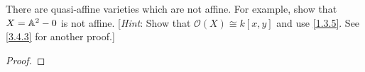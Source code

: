 \label{1.3.6}

There are quasi-affine varieties which are not affine. For example, show that $X = \mathbb A^2 - 0$ is not affine. [\emph{Hint}: Show that $\mathcal O(X) \cong k[x, y]$ and use \ref{1.3.5}. See \ref{3.4.3} for another proof.]

\begin{proof}

\end{proof}
